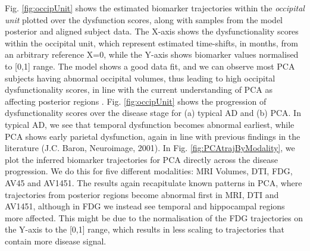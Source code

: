 \documentclass{llncs}
\begin{document}
Fig. \ref{fig:occipUnit} shows the estimated biomarker trajectories within the \emph{occipital unit} plotted over the dysfunction scores, along with samples from the model posterior and aligned subject data. The X-axis shows the dysfunctionality scores within the occipital unit, which represent estimated time-shifts, in months, from an arbitrary reference X=0, while the Y-axis shows biomarker values normalised to [0,1] range. The model shows a good data fit, and we can observe most PCA subjects having abnormal occipital volumes, thus leading to high occipital dysfunctionality scores, in line with the current understanding of PCA as affecting posterior regions \cite{crutch2012posterior}. Fig. \ref{fig:occipUnit} shows the progression of dysfunctionality scores over the disease stage for (a) typical AD and (b) PCA. In typical AD, we see that temporal dysfunction becomes abnormal earliest, while PCA shows early parietal dysfunction, again in line with previous findings in the literature \cite{crutch2012posterior} (J.C. Baron, Neuroimage, 2001). In Fig. \ref{fig:PCAtrajByModality}, we plot the inferred biomarker trajectories for PCA directly across the disease progression. We do this for five different modalities: MRI Volumes, DTI, FDG, AV45 and AV1451. The results again recapitulate known patterns in PCA, where trajectories from posterior regions become abnormal first in MRI, DTI and AV1451, although in FDG we instead see temporal and hippocampal regions more affected. This might be due to the normalisation of the FDG trajectories on the Y-axis to the [0,1] range, which results in less scaling to trajectories that contain more disease signal. 

\newcommand{\expFld}{figures}
\end{document}
